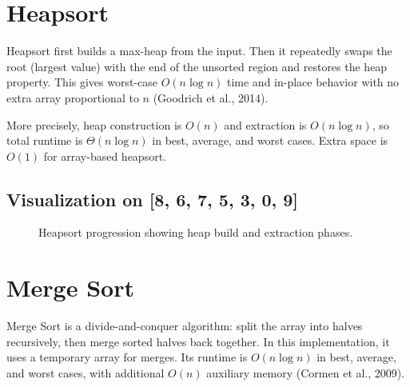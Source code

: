 \documentclass[12pt]{article}
\begin{document}
\section{Heapsort}
Heapsort first builds a max-heap from the input. Then it repeatedly swaps the root (largest value) with the end of the unsorted region and restores the heap property. This gives worst-case $O(n \log n)$ time and in-place behavior with no extra array proportional to $n$ (Goodrich et al., 2014).

More precisely, heap construction is $O(n)$ and extraction is $O(n \log n)$, so total runtime is $\Theta(n \log n)$ in best, average, and worst cases. Extra space is $O(1)$ for array-based heapsort.

\subsection*{Visualization on [8, 6, 7, 5, 3, 0, 9]}
\begin{figure}[H]
\centering
{}
\caption{Heapsort progression showing heap build and extraction phases.}
\end{figure}

\section{Merge Sort}
Merge Sort is a divide-and-conquer algorithm: split the array into halves recursively, then merge sorted halves back together. In this implementation, it uses a temporary array for merges. Its runtime is $O(n \log n)$ in best, average, and worst cases, with additional $O(n)$ auxiliary memory (Cormen et al., 2009).
\end{document}
